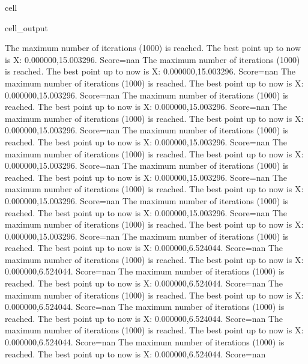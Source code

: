\documentclass[letterpaper,10pt,english]{jupyterBook}
\begin{document}
\begin{sphinxuseclass}{cell}
\begin{sphinxVerbatimOutput}
\begin{sphinxuseclass}{cell_output}
\begin{sphinxVerbatim}[commandchars=\\\{\}]
The maximum number of iterations (1000) is reached. The best point up to now is X: \PYGZob{}0.000000,15.003296\PYGZcb{}. Score=\PYGZhy{}nan
The maximum number of iterations (1000) is reached. The best point up to now is X: \PYGZob{}0.000000,15.003296\PYGZcb{}. Score=\PYGZhy{}nan
The maximum number of iterations (1000) is reached. The best point up to now is X: \PYGZob{}0.000000,15.003296\PYGZcb{}. Score=\PYGZhy{}nan
The maximum number of iterations (1000) is reached. The best point up to now is X: \PYGZob{}0.000000,15.003296\PYGZcb{}. Score=\PYGZhy{}nan
The maximum number of iterations (1000) is reached. The best point up to now is X: \PYGZob{}0.000000,15.003296\PYGZcb{}. Score=\PYGZhy{}nan
The maximum number of iterations (1000) is reached. The best point up to now is X: \PYGZob{}0.000000,15.003296\PYGZcb{}. Score=\PYGZhy{}nan
The maximum number of iterations (1000) is reached. The best point up to now is X: \PYGZob{}0.000000,15.003296\PYGZcb{}. Score=\PYGZhy{}nan
The maximum number of iterations (1000) is reached. The best point up to now is X: \PYGZob{}0.000000,15.003296\PYGZcb{}. Score=\PYGZhy{}nan
The maximum number of iterations (1000) is reached. The best point up to now is X: \PYGZob{}0.000000,15.003296\PYGZcb{}. Score=\PYGZhy{}nan
The maximum number of iterations (1000) is reached. The best point up to now is X: \PYGZob{}0.000000,15.003296\PYGZcb{}. Score=\PYGZhy{}nan
The maximum number of iterations (1000) is reached. The best point up to now is X: \PYGZob{}0.000000,15.003296\PYGZcb{}. Score=\PYGZhy{}nan
The maximum number of iterations (1000) is reached. The best point up to now is X: \PYGZob{}0.000000,\PYGZhy{}6.524044\PYGZcb{}. Score=\PYGZhy{}nan
The maximum number of iterations (1000) is reached. The best point up to now is X: \PYGZob{}0.000000,\PYGZhy{}6.524044\PYGZcb{}. Score=\PYGZhy{}nan
The maximum number of iterations (1000) is reached. The best point up to now is X: \PYGZob{}0.000000,\PYGZhy{}6.524044\PYGZcb{}. Score=\PYGZhy{}nan
The maximum number of iterations (1000) is reached. The best point up to now is X: \PYGZob{}0.000000,\PYGZhy{}6.524044\PYGZcb{}. Score=\PYGZhy{}nan
The maximum number of iterations (1000) is reached. The best point up to now is X: \PYGZob{}0.000000,\PYGZhy{}6.524044\PYGZcb{}. Score=\PYGZhy{}nan
The maximum number of iterations (1000) is reached. The best point up to now is X: \PYGZob{}0.000000,\PYGZhy{}6.524044\PYGZcb{}. Score=\PYGZhy{}nan
The maximum number of iterations (1000) is reached. The best point up to now is X: \PYGZob{}0.000000,\PYGZhy{}6.524044\PYGZcb{}. Score=\PYGZhy{}nan

\end{sphinxVerbatim}
\end{sphinxuseclass}
\end{sphinxVerbatimOutput}
\end{sphinxuseclass}
\end{document}

